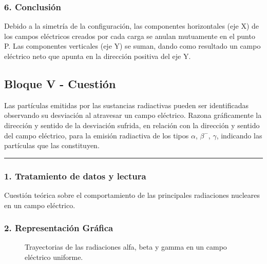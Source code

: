 \subsubsection*{6. Conclusión}
\begin{cajaconclusion}
Debido a la simetría de la configuración, las componentes horizontales (eje X) de los campos eléctricos creados por cada carga se anulan mutuamente en el punto P. Las componentes verticales (eje Y) se suman, dando como resultado un campo eléctrico neto que apunta en la dirección positiva del eje Y.
\end{cajaconclusion}
\newpage

\subsection{Bloque V - Cuestión}
\label{subsec:B5_2017_jul_ext}

\begin{cajaenunciado}
Las partículas emitidas por las sustancias radiactivas pueden ser identificadas observando su desviación al atravesar un campo eléctrico. Razona gráficamente la dirección y sentido de la desviación sufrida, en relación con la dirección y sentido del campo eléctrico, para la emisión radiactiva de los tipos $\alpha$, $\beta^{-}$, $\gamma$, indicando las partículas que las constituyen.
\end{cajaenunciado}
\hrule

\subsubsection*{1. Tratamiento de datos y lectura}
Cuestión teórica sobre el comportamiento de las principales radiaciones nucleares en un campo eléctrico.

\subsubsection*{2. Representación Gráfica}
\begin{figure}[H]
    \centering
    \caption{Trayectorias de las radiaciones alfa, beta y gamma en un campo eléctrico uniforme.}
\end{figure}

